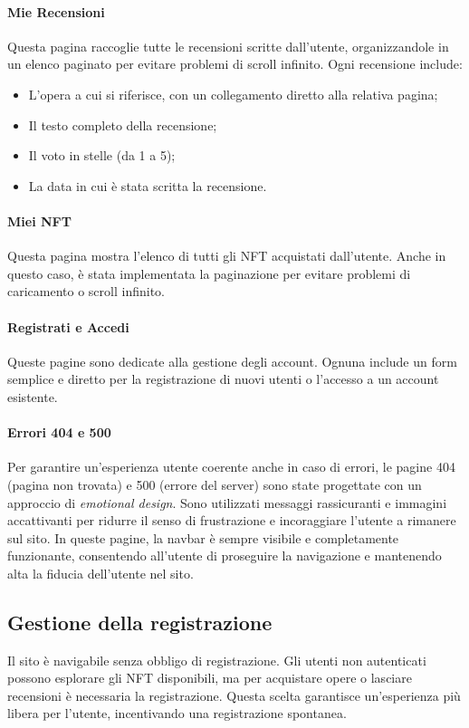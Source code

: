 \documentclass[10pt]{article}
\begin{document}
\paragraph{Mie Recensioni}
Questa pagina raccoglie tutte le recensioni scritte dall’utente, organizzandole in un elenco paginato per evitare problemi di scroll infinito. Ogni recensione include:
\begin{itemize}
    \item L’opera a cui si riferisce, con un collegamento diretto alla relativa pagina;
    \item Il testo completo della recensione;
    \item Il voto in stelle (da 1 a 5);
    \item La data in cui è stata scritta la recensione.
\end{itemize} 

\paragraph{Miei NFT}
Questa pagina mostra l’elenco di tutti gli NFT acquistati dall’utente. Anche in questo caso, è stata implementata la paginazione per evitare problemi di caricamento o scroll infinito.

\paragraph{Registrati e Accedi} Queste pagine sono dedicate alla gestione degli account. Ognuna include un form semplice e diretto per la registrazione di nuovi utenti o l’accesso a un account esistente.

\paragraph{Errori 404 e 500} Per garantire un’esperienza utente coerente anche in caso di errori, le pagine 404 (pagina non trovata) e 500 (errore del server) sono state progettate con un approccio di \textit{emotional design}. Sono utilizzati messaggi rassicuranti e immagini accattivanti per ridurre il senso di frustrazione e incoraggiare l’utente a rimanere sul sito. In queste pagine, la navbar è sempre visibile e completamente funzionante, consentendo all’utente di proseguire la navigazione e mantenendo alta la fiducia dell’utente nel sito.

\subsection{Gestione della registrazione}
Il sito è navigabile senza obbligo di registrazione. Gli utenti non autenticati possono esplorare gli NFT disponibili, ma per acquistare opere o lasciare recensioni è necessaria la registrazione. Questa scelta garantisce un’esperienza più libera per l'utente, incentivando una registrazione spontanea.
\end{document}

